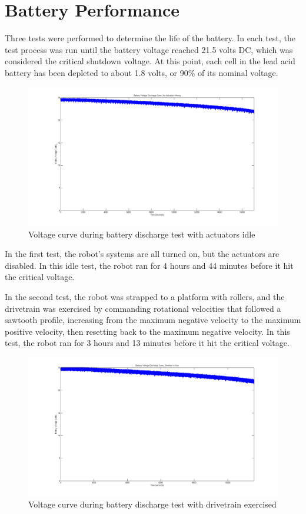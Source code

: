 \documentclass[]{cwru} %
\begin{document}
\section{Battery Performance}

Three tests were performed to determine the life of the battery. In each
test, the test process was run until the battery voltage reached 21.5
volts DC, which was considered the critical shutdown voltage. At this
point, each cell in the lead acid battery has been depleted to about 1.8
volts, or 90\% of its nominal voltage.

\begin{figure}[ht]
\centering
\includegraphics[width=6.0in]{discharge_idle}
\caption{Voltage curve during battery discharge test with actuators idle}
\label{fig:discharge-idle}
\end{figure}

In the first test, the robot's systems are all turned on, but the
actuators are disabled. In this idle test, the robot ran for 4 hours and
44 minutes before it hit the critical voltage.

In the second test, the robot was strapped to a platform with rollers,
and the drivetrain was exercised by commanding rotational velocities
that followed a sawtooth profile, increasing from the maximum negative
velocity to the maximum positive velocity, then resetting back to the
maximum negative velocity. In this test, the robot ran for 3 hours and
13 minutes before it hit the critical voltage.

\begin{figure}[ht]
\centering
\includegraphics[width=6.0in]{discharge_drive}
\caption{Voltage curve during battery discharge test with drivetrain exercised}
\label{fig:discharge-drive}
\end{figure}
\end{document}
